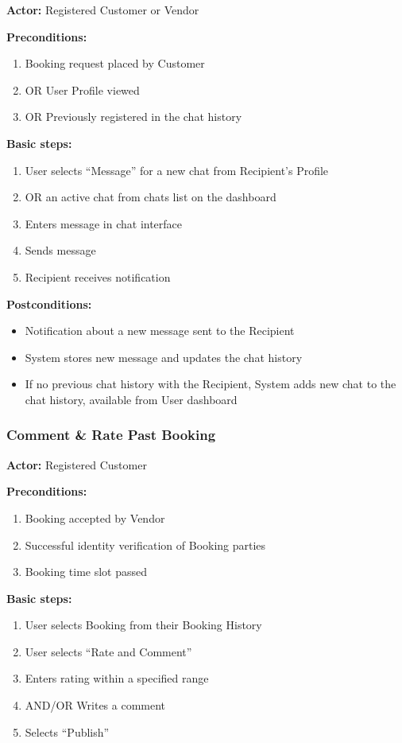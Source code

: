 \documentclass[11pt,a4paper]{article}
\begin{document}
\textbf{Actor:} Registered Customer or Vendor

\noindent \textbf{Preconditions:}
\begin{enumerate}
  \item Booking request placed by Customer
  \item OR User Profile viewed
  \item OR Previously registered in the chat history
\end{enumerate}

\noindent \textbf{Basic steps:}
\begin{enumerate}
  \item User selects ``Message'' for a new chat from Recipient's Profile
  \item OR an active chat from chats list on the dashboard
  \item Enters message in chat interface
  \item Sends message
  \item Recipient receives notification
\end{enumerate}

\noindent \textbf{Postconditions:}
\begin{itemize}
  \item Notification about a new message sent to the Recipient
  \item System stores new message and updates the chat history
  \item If no previous chat history with the Recipient, System adds
    new chat to the chat history, available from User dashboard
\end{itemize}

\subsubsection{Comment \& Rate Past Booking }

\textbf{Actor:} Registered Customer

\noindent \textbf{Preconditions:}
\begin{enumerate}
  \item Booking accepted by Vendor
  \item Successful identity verification of Booking parties
  \item Booking time slot passed
\end{enumerate}

\noindent \textbf{Basic steps:}
\begin{enumerate}
  \item User selects Booking from their Booking History
  \item User selects ``Rate and Comment''
  \item Enters rating within a specified range
  \item AND/OR Writes a comment  
  \item Selects ``Publish''
\end{enumerate}
\end{document}
